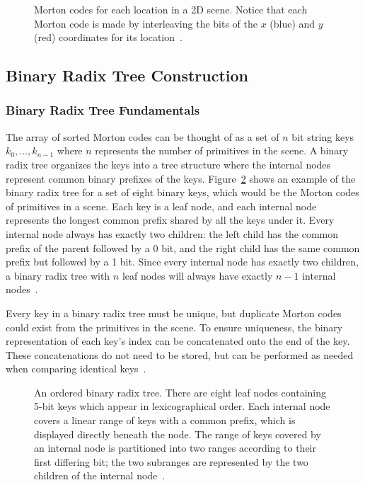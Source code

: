 \documentclass{sig-alternate}
\begin{document}
\begin{figure}
\centering
{}
\caption{Morton codes for each location in a 2D scene. Notice that each Morton code is made by interleaving the bits of the $x$ (blue) and $y$ (red) coordinates for its location~\cite{wiki:morton}.}
\label{fig:MortonCodeFigure}
\end{figure} 

\subsection{Binary Radix Tree Construction}
\label{sec:brts}

\subsubsection{Binary Radix Tree Fundamentals}
\label{sec:brtFundamentals}

The array of sorted Morton codes can be thought of as a set of $n$ bit string keys \begin{math}k_{0},\dots,k_{n-1}\end{math} where $n$ represents the number of primitives in the scene. A binary radix tree organizes the keys into a tree structure where the internal nodes represent common binary prefixes of the keys. Figure~\ref{fig:BinaryRadixTree} shows an example of the binary radix tree for a set of eight binary keys, which would be the Morton codes of primitives in a scene. Each key is a leaf node, and each internal node represents the longest common prefix shared by all the keys under it. Every internal node always has exactly two children: the left child has the common prefix of the parent followed by a 0 bit, and the right child has the same common prefix but followed by a 1 bit. Since every internal node has exactly two children, a binary radix tree with $n$ leaf nodes will always have exactly $n-1$ internal nodes~\cite{Karras:2012}.

Every key in a binary radix tree must be unique, but duplicate Morton codes could exist from the primitives in the scene. To ensure uniqueness, the binary representation of each key's index can be concatenated onto the end of the key. These concatenations do not need to be stored, but can be performed as needed when comparing identical keys~\cite{Karras:2012}.

\begin{figure}
\centering
{}
\caption{An ordered binary radix tree. There are eight leaf nodes containing 5-bit keys which appear in lexicographical order. Each internal node covers a linear range of keys with a common prefix, which is displayed directly beneath the node. The range of keys covered by an internal node is partitioned into two ranges according to their first differing bit; the two subranges are represented by the two children of the internal node~\cite{Karras:2012}.}
\label{fig:BinaryRadixTree}
\end{figure}
\end{document}
